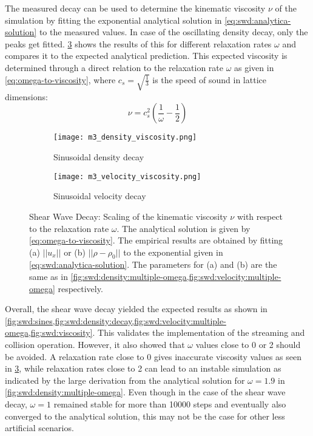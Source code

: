 The measured decay can be used to determine the kinematic viscosity $\nu$ of the simulation by fitting the exponential analytical solution in \cref{eq:swd:analytica-solution} to the measured values. In case of the oscillating density decay, only the peaks get fitted. \cref{fig:swd:viscosity} shows the results of this for different relaxation rates $\omega$ and compares it to the expected analytical prediction. This expected viscosity is determined through a direct relation to the relaxation rate $\omega$ as given in \cref{eq:omega-to-viscosity}, where $c_s=\sqrt{\frac{1}{3}}$ is the speed of sound in lattice dimensions:
\begin{equation}
    \nu = c_s^2 \left(\frac{1}{\omega} - \frac{1}{2}\right)
    \label{eq:omega-to-viscosity}
\end{equation}

\begin{figure}[ht!]
    \begin{subfigure}{0.5\linewidth}
        \centering
        \texttt{[image: m3\_density\_viscosity.png]}
        \caption{Sinusoidal density decay}
        \label{fig:swd:density:viscosity}
    \end{subfigure}%
    \begin{subfigure}{0.5\linewidth}
        \centering
        \texttt{[image: m3\_velocity\_viscosity.png]}
        \caption{Sinusoidal velocity decay}
        \label{fig:swd:velocity:viscosity}
    \end{subfigure}
    \caption[Shear Wave Decay: Scaling of the kinematic viscosity $\nu$ with respect to the relaxation rate $\omega$]{Shear Wave Decay: Scaling of the kinematic viscosity $\nu$ with respect to the relaxation rate $\omega$. The analytical solution is given by \cref{eq:omega-to-viscosity}. The empirical results are obtained by fitting (a) $||u_x||$ or (b) $||\rho-\rho_0||$ to the exponential given in \cref{eq:swd:analytica-solution}. The parameters for (a) and (b) are the same as in \cref{fig:swd:density:multiple-omega,fig:swd:velocity:multiple-omega} respectively.}
    \label{fig:swd:viscosity}
\end{figure}

Overall, the shear wave decay yielded the expected results as shown in \cref{fig:swd:sines,fig:swd:density:decay,fig:swd:velocity:multiple-omega,fig:swd:viscosity}. This validates the implementation of the streaming and collision operation. However, it also showed that $\omega$ values close to 0 or 2 should be avoided. A relaxation rate close to 0 gives inaccurate viscosity values as seen in \cref{fig:swd:viscosity}, while relaxation rates close to 2 can lead to an instable simulation as indicated by the large derivation from the analytical solution for $\omega=1.9$ in \cref{fig:swd:density:multiple-omega}. Even though in the case of the shear wave decay, $\omega=1$ remained stable for more than 10000 steps and eventually also converged to the analytical solution, this may not be the case for other less artificial scenarios.

